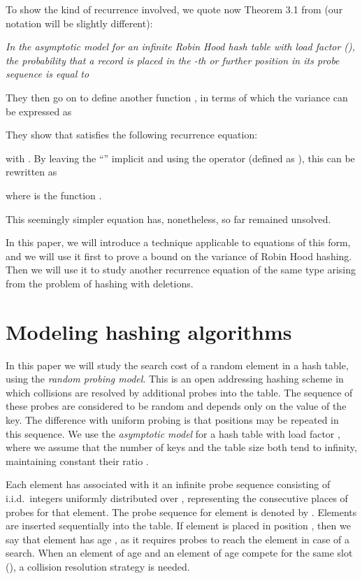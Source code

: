 \documentclass[proceedings]{aofa}
\begin{document}
To show the kind of recurrence involved, we quote now Theorem 3.1 from \cite{CelisT} (our notation will be slightly different):

 {\em In the asymptotic model for an infinite Robin Hood hash table with load factor  (), the probability  that a record is placed in the -th or further position in its probe sequence is equal to}



They then go on to define another function , in terms of which the variance can be expressed as


They show that satisfies the following recurrence equation:

with .
By leaving the ``'' implicit and using the  operator (defined as ), this can be rewritten as

where  is the function .

This seemingly simpler equation has, nonetheless, so far remained unsolved.

In this paper, we will introduce a technique applicable to equations of this form, and we will use it first to prove a bound on the variance of Robin Hood hashing. Then we will use it to study another recurrence equation of the same type arising from the problem of hashing with deletions.

\section{Modeling hashing algorithms}


In this paper we will study the search cost of a
random element in a hash table, using the \emph{random probing model}.
This is an open addressing
hashing scheme in which collisions are resolved by additional probes
into the table.  The sequence of these probes are considered to be
random and depends only on the value of the key. The difference with
uniform probing is that positions may be repeated in this sequence.
We use the {\em asymptotic model} for a hash table with load factor  \cite{guibas1976analysis,Guibas:1978:AHT:322092.322096,Celis,Mit}, where we assume that
the number of keys  and the table size 
both tend to infinity, maintaining constant their ratio .

Each element has associated with it
an infinite probe sequence consisting of
i.i.d.\ integers uniformly distributed over
, representing the
consecutive places of probes for that element.
The probe sequence for element  is
denoted by .
Elements are inserted sequentially into the table.
If element  is placed in position ,
then we say that element  has age ,
as it requires  probes to reach the element in
case of a search.
When an element  of age  and
an element  of age  compete for the same slot (),
a collision resolution strategy is needed.
\end{document}
